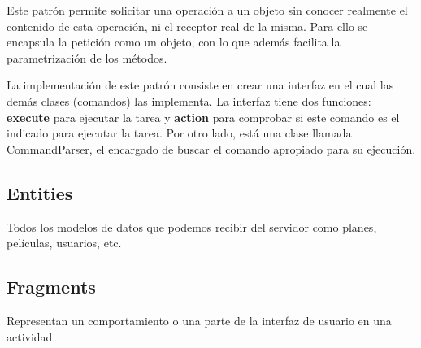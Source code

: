 Este patrón permite solicitar una operación a un objeto sin conocer realmente el contenido de esta operación, ni el receptor real de la misma. Para ello se encapsula la petición como un objeto, con lo que además facilita la parametrización de los métodos.

La implementación de este patrón consiste en crear una interfaz en el cual las demás clases (comandos) las implementa. La interfaz tiene dos funciones: \textbf{execute} para ejecutar la tarea y \textbf{action} para comprobar si este comando es el indicado para ejecutar la tarea. Por otro 
lado, está una clase llamada CommandParser, el encargado de buscar el comando apropiado para su ejecución.

\subsection{Entities}
\label{makereference4.3.4}
Todos los modelos de datos que podemos recibir del servidor como planes, películas, usuarios, etc.

\subsection{Fragments}
\label{makereference4.3.5}
Representan un comportamiento o una parte de la interfaz de usuario en una actividad.

